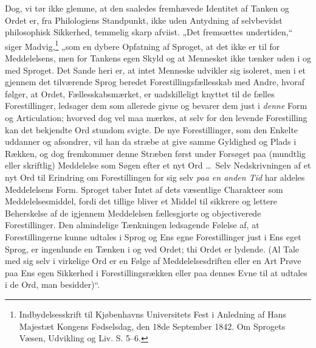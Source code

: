 \documentclass[12pt]{book}
\newcommand{\opage}[1]{\marginnote{\footnotesize\textit{[#1]}}}
\begin{document}
Dog, vi tør ikke glemme, at den saaledes fremhævede Identitet
af Tanken og Ordet er, fra Philologiens Standpunkt, ikke
uden Antydning af selvbevidst philosophisk Sikkerhed, temmelig
skarp afviist. „Det fremsættes undertiden,“ siger Madvig,\footnote{Indbydelsesskrift
til Kjøbenhavns Universitets Fest i Anledning af
Hans Majestæt Kongens Fødselsdag, den 18de September 1842.
Om Sprogets Væsen, Udvikling og Liv. S. 5--6.}%
„som en dybere Opfatning af Sproget, at det ikke er til for
Meddelelsens, men for Tankens egen Skyld og at Mennesket
ikke tænker uden i og med Sproget. Det Sande heri er, at
intet Menneske udvikler sig isoleret, men i et gjennem det tilværende
Sprog beredet Forestillingsfællesskab med Andre, hvoraf
følger, at Ordet, Fællesskabsmærket, er uadskilleligt knyttet til
de fælles Forestillinger, ledsager dem som allerede givne og
bevarer dem just i \emph{denne} Form og Articulation; hvorved dog
vel maa mærkes, at selv for den levende Forestilling kan det
bekjendte Ord stundom svigte. De nye Forestillinger, som den
Enkelte uddanner og afsondrer, vil han da stræbe at give
samme Gyldighed og Plads i Rækken, og dog fremkommer
denne Stræben først under Forsøget paa (mundtlig eller
skriftlig) Meddelelse som Søgen efter et nyt Ord \dots\ Selv
Nedskrivningen af et nyt Ord til Erindring om Forestillingen
for sig selv \emph{paa en anden Tid} har aldeles Meddelelsens
Form. Sproget taber Intet af dets væsentlige Charakteer
som Meddelelsesmiddel, fordi det tillige bliver et Middel til
sikkrere og lettere Beherskelse af de igjennem Meddelelsen
fællesgjorte og objectiverede Forestillinger. Den almindelige
\opage{22}Tænkningen ledsagende Følelse af, at Forestillingerne kunne
udtales i Sprog og Ens egne Forestillinger just i Ens eget Sprog,
er ingenlunde en Tænken i og ved Ordet; thi Ordet er lydende.
(Al Tale med sig selv i virkelige Ord er en Følge af Meddelelsesdriften
eller en Art Prøve paa Ens egen Sikkerhed i
Forestillingsrækken eller paa dennes Evne til at udtales i de
Ord, man besidder)“.
\end{document}
